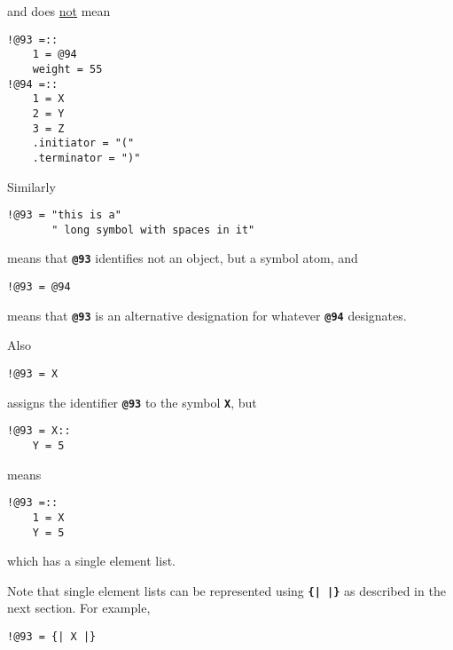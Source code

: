 \documentclass[12pt]{article}
\newcommand{\TT}[1]{{\tt \bfseries #1}}
\newenvironment{indpar}[1][0.3in]%
	{\begin{list}{}%
		     {\setlength{\itemsep}{0in}%
		      \setlength{\topsep}{0in}%
		      \setlength{\parsep}{1ex}%
		      \setlength{\labelwidth}{#1}%
		      \setlength{\leftmargin}{#1}%
		      \addtolength{\leftmargin}{\labelsep}}%
	 \item}%
	{\end{list}}
\begin{document}
and does \underline{not} mean

\begin{indpar}\begin{verbatim}
!@93 =::
    1 = @94
    weight = 55
!@94 =::
    1 = X
    2 = Y
    3 = Z
    .initiator = "("
    .terminator = ")"
\end{verbatim}\end{indpar}

Similarly

\begin{indpar}\begin{verbatim}
!@93 = "this is a"
       " long symbol with spaces in it"
\end{verbatim}\end{indpar}

means that \TT{@93} identifies not an object, but a symbol
atom, and

\begin{indpar}\begin{verbatim}
!@93 = @94
\end{verbatim}\end{indpar}

means that \TT{@93} is an alternative designation for whatever
\TT{@94} designates.

Also
\begin{indpar}\begin{verbatim}
!@93 = X
\end{verbatim}\end{indpar}

assigns the identifier \TT{@93} to the symbol \TT{X}, but

\begin{indpar}\begin{verbatim}
!@93 = X::
    Y = 5
\end{verbatim}\end{indpar}

means

\begin{indpar}\begin{verbatim}
!@93 =::
    1 = X
    Y = 5
\end{verbatim}\end{indpar}

which has a single element list.

Note that single element lists can be represented using \TT{\{|~|\}}
as described in the next section.  For example,

\begin{indpar}\begin{verbatim}
!@93 = {| X |}
\end{verbatim}\end{indpar}
\end{document}

